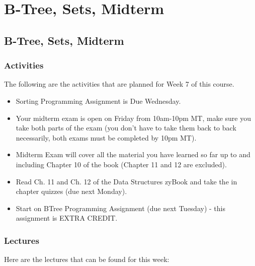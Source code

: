 \clearpage

\renewcommand{\ChapTitle}{B-Tree, Sets, Midterm}

\chapter{\ChapTitle}
\section{\ChapTitle}

\subsection{Activities}

The following are the activities that are planned for Week 7 of this course.

\begin{itemize}
    \item Sorting Programming Assignment is Due Wednesday.
    \item Your midterm exam is open on Friday from 10am-10pm MT, make sure you take both parts of the exam (you don't have to take them back to back necessarily, both exams must be completed by 10pm MT).
    \item Midterm Exam will cover all the material you have learned so far up to and including Chapter 10 of the book (Chapter 11 and 12 are excluded).
    \item Read Ch. 11 and Ch. 12 of the Data Structures zyBook and take the in chapter quizzes (due next Monday).
    \item Start on BTree Programming Assignment (due next Tuesday) - this assignment is EXTRA CREDIT.
\end{itemize}

\subsection{Lectures}

Here are the lectures that can be found for this week:

